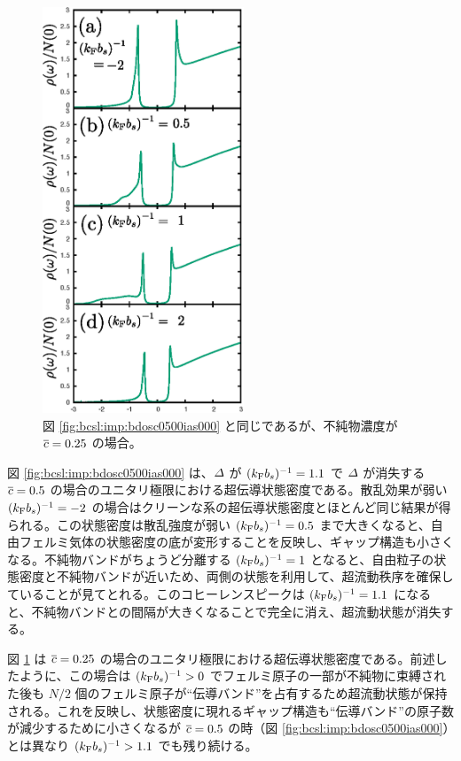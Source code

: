 \begin{figure}[t]
\centering
\includegraphics[width=60mm]{eps/bcsl-dos-c0250s.eps}
\caption{図 \ref{fig:bcsl:imp:bdosc0500ias000} と同じであるが、不純物濃度が $\overline{c}=0.25$ の場合。}
\label{fig:bcsl:imp:bdosc0250ias000}
\end{figure}


図 \ref{fig:bcsl:imp:bdosc0500ias000} は、$\varDelta$ が $(k_{\text{F}} b_s)^{-1}=1.1$ で $\varDelta$ が消失する $\overline{c}=0.5$ の場合のユニタリ極限における超伝導状態密度である。散乱効果が弱い $(k_{\text{F}} b_s)^{-1} = -2$ の場合はクリーンな系の超伝導状態密度とほとんど同じ結果が得られる。この状態密度は散乱強度が弱い $(k_{\text{F}} b_s)^{-1}=0.5$ まで大きくなると、自由フェルミ気体の状態密度の底が変形することを反映し、ギャップ構造も小さくなる。不純物バンドがちょうど分離する $(k_{\text{F}} b_s)^{-1}=1$ となると、自由粒子の状態密度と不純物バンドが近いため、両側の状態を利用して、超流動秩序を確保していることが見てとれる。このコヒーレンスピークは $(k_{\text{F}} b_s)^{-1}=1.1$ になると、不純物バンドとの間隔が大きくなることで完全に消え、超流動状態が消失する。


図 \ref{fig:bcsl:imp:bdosc0250ias000} は $\overline{c}=0.25$ の場合のユニタリ極限における超伝導状態密度である。前述したように、この場合は $(k_{\text{F}} b_s)^{-1}>0$ でフェルミ原子の一部が不純物に束縛された後も $N/2$ 個のフェルミ原子が“伝導バンド”を占有するため超流動状態が保持される。これを反映し、状態密度に現れるギャップ構造も“伝導バンド”の原子数が減少するために小さくなるが $\overline{c}=0.5$ の時（図 \ref{fig:bcsl:imp:bdosc0500ias000}）とは異なり $(k_{\text{F}} b_s)^{-1} > 1.1 $ でも残り続ける。


